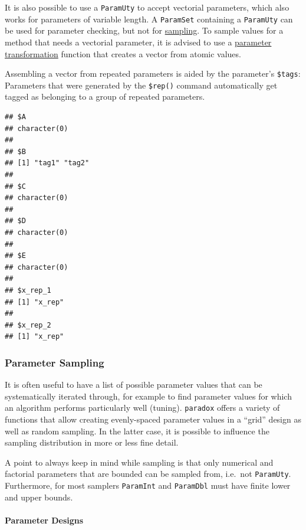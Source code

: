 \documentclass[]{article}
\newenvironment{Shaded}{\begin{snugshade}}{\end{snugshade}}
\newcommand{\NormalTok}[1]{#1}
\newcommand{\OperatorTok}[1]{\textcolor[rgb]{0.81,0.36,0.00}{\textbf{#1}}}
\let\oldparagraph\paragraph
\renewcommand{\paragraph}[1]{\oldparagraph{#1}\mbox{}}
\renewenvironment{Shaded} {\begin{snugshade}\small} {\end{snugshade}}
\begin{document}
It is also possible to use a \texttt{ParamUty} to accept vectorial parameters, which also works for parameters of variable length.
A \texttt{ParamSet} containing a \texttt{ParamUty} can be used for parameter checking, but not for \protect\hyperlink{parameter-sampling}{sampling}.
To sample values for a method that needs a vectorial parameter, it is advised to use a \protect\hyperlink{transformation-between-types}{parameter transformation} function that creates a vector from atomic values.

Assembling a vector from repeated parameters is aided by the parameter's \texttt{\$tags}: Parameters that were generated by the \texttt{\$rep()} command automatically get tagged as belonging to a group of repeated parameters.

\begin{Shaded}
\end{Shaded}

\begin{verbatim}
## $A
## character(0)
## 
## $B
## [1] "tag1" "tag2"
## 
## $C
## character(0)
## 
## $D
## character(0)
## 
## $E
## character(0)
## 
## $x_rep_1
## [1] "x_rep"
## 
## $x_rep_2
## [1] "x_rep"
\end{verbatim}

\hypertarget{parameter-sampling}{%
\subsubsection{Parameter Sampling}\label{parameter-sampling}}

It is often useful to have a list of possible parameter values that can be systematically iterated through, for example to find parameter values for which an algorithm performs particularly well (tuning).
\texttt{paradox} offers a variety of functions that allow creating evenly-spaced parameter values in a ``grid'' design as well as random sampling.
In the latter case, it is possible to influence the sampling distribution in more or less fine detail.

A point to always keep in mind while sampling is that only numerical and factorial parameters that are bounded can be sampled from, i.e.~not \texttt{ParamUty}.
Furthermore, for most samplers \texttt{ParamInt} and \texttt{ParamDbl} must have finite lower and upper bounds.

\hypertarget{parameter-designs}{%
\paragraph{Parameter Designs}\label{parameter-designs}}
\end{document}

